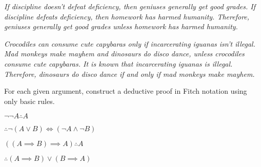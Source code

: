 \documentclass[a4paper,12pt]{article}
\begin{document}
\begin{tasks}
\begin{subtasks}
        \item \textit{If discipline doesn't defeat deficiency, then geniuses generally get good grades.
        If discipline defeats deficiency, then homework has harmed humanity.
        Therefore, geniuses generally get good grades unless homework has harmed humanity.}

        \item \textit{Crocodiles can consume cute capybaras only if incarcerating iguanas isn't illegal.
        Mad monkeys make mayhem and dinosaurs do disco dance, unless crocodiles consume cute capybaras.
        It is known that incarcerating iguanas is illegal.
        Therefore, dinosaurs do disco dance if and only if mad monkeys make mayhem.}
    \end{subtasks}


    \item For each given argument, construct a deductive proof in Fitch notation using only basic rules.

    \begin{multicols}{2}
    \begin{subtasks}
        \item $\neg\neg A \therefore A$
        \item ${} \therefore \neg (A \lor B) \iff (\neg A \land \neg B)$
        \item $((A \implies B) \implies A) \therefore A$
        \item ${} \therefore (A \implies B) \lor (B \implies A)$
    \end{subtasks}
    \end{multicols}

\end{tasks}
\end{document}
